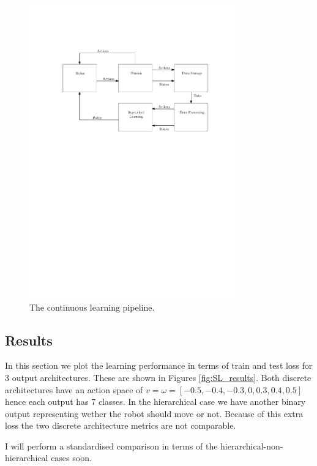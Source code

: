 \documentclass[a4paper,11pt]{report}
\begin{document}
	
	\begin{figure}
	\centering
	    \includegraphics[width=0.8\textwidth]{figures/pipeline.pdf}
	  \caption[Pipeline]{The continuous learning pipeline.}
	  \label{fig:pipeline}
	\end{figure}


\subsection{Results}\label{sec:sl_res}
In this section we plot the learning performance in terms of train and test loss for 3 output architectures. These are shown in Figures \ref{fig:SL_results}. Both discrete architectures have an action space of $v=\omega = [-0.5,-0.4,-0.3,0,0.3,0.4,0.5]$ hence each output has 7 classes. In the hierarchical case we have another binary output representing wether the robot should move or not. Because of this extra loss the two discrete architecture metrics are not comparable.

 I will perform a standardised comparison in terms of the hierarchical-non-hierarchical cases soon.
\end{document}
